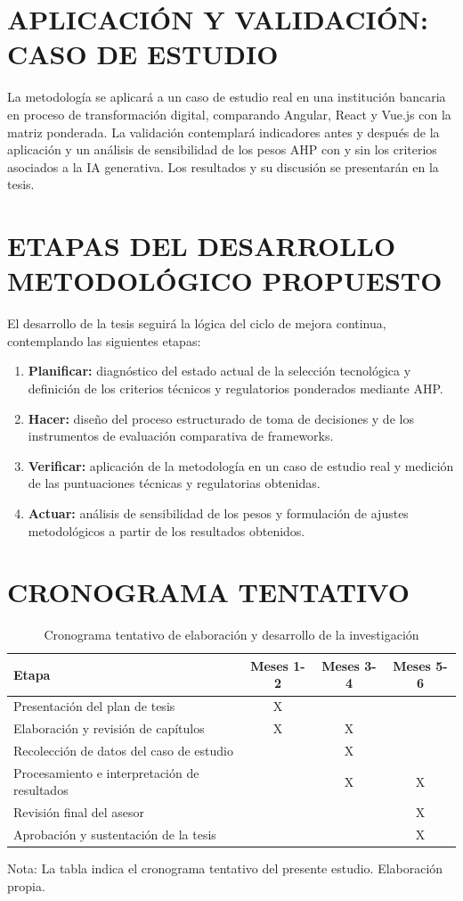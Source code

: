 \section{APLICACIÓN Y VALIDACIÓN: CASO DE ESTUDIO}

La metodología se aplicará a un caso de estudio real en una institución
bancaria en proceso de transformación digital, comparando Angular, React y
Vue.js con la matriz ponderada. La validación contemplará indicadores antes y
después de la aplicación y un análisis de sensibilidad de los pesos AHP con y
sin los criterios asociados a la IA generativa. Los resultados y su discusión
se presentarán en la tesis.

\section{ETAPAS DEL DESARROLLO METODOLÓGICO PROPUESTO}

El desarrollo de la tesis seguirá la lógica del ciclo de mejora continua,
contemplando las siguientes etapas:

\begin{enumerate}
  \item \textbf{Planificar:} diagnóstico del estado actual de la selección
        tecnológica y definición de los criterios técnicos y regulatorios
        ponderados mediante AHP.
  \item \textbf{Hacer:} diseño del proceso estructurado de toma de decisiones
        y de los instrumentos de evaluación comparativa de frameworks.
  \item \textbf{Verificar:} aplicación de la metodología en un caso de estudio
        real y medición de las puntuaciones técnicas y regulatorias obtenidas.
  \item \textbf{Actuar:} análisis de sensibilidad de los pesos y formulación
        de ajustes metodológicos a partir de los resultados obtenidos.
\end{enumerate}

\section*{CRONOGRAMA TENTATIVO}

\begin{table}[htbp]
\centering
\caption{Cronograma tentativo de elaboración y desarrollo de la investigación}
\label{tab:4.crono}
\small
\begin{tabular}{|p{6.4cm}|c|c|c|}
\hline
\textbf{Etapa} & \textbf{Meses 1-2} & \textbf{Meses 3-4} & \textbf{Meses 5-6} \\ \hline
Presentación del plan de tesis & X & & \\ \hline
Elaboración y revisión de capítulos & X & X & \\ \hline
Recolección de datos del caso de estudio & & X & \\ \hline
Procesamiento e interpretación de resultados & & X & X \\ \hline
Revisión final del asesor & & & X \\ \hline
Aprobación y sustentación de la tesis & & & X \\ \hline
\end{tabular}
\end{table}

\noindent Nota: La tabla indica el cronograma tentativo del presente estudio.
Elaboración propia.

